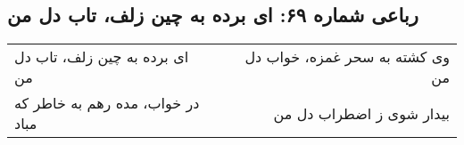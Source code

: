 \begin{center}
\section*{رباعی شماره ۶۹: ای برده به چین زلف، تاب دل من}
\label{sec:069}
\begin{longtable}{l p{0.5cm} r}
ای برده به چین زلف، تاب دل من
&&
وی کشته به سحر غمزه، خواب دل من
\\
در خواب، مده رهم به خاطر که مباد
&&
بیدار شوی ز اضطراب دل من
\\
\end{longtable}
\end{center}
